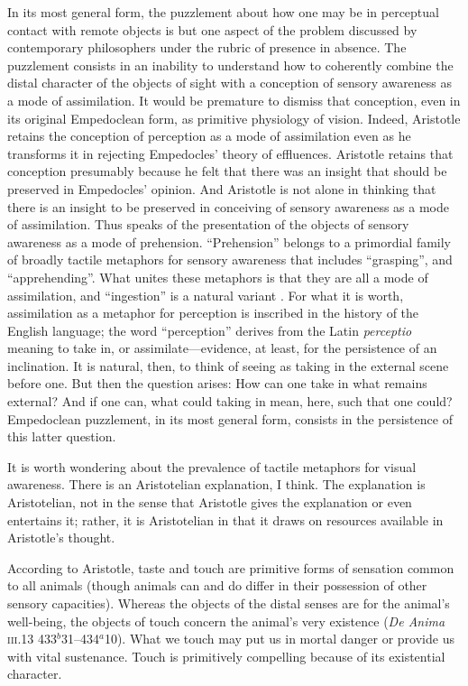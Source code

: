 In its most general form, the puzzlement about how one may be in perceptual contact with remote objects is but one aspect of the problem discussed by contemporary philosophers under the rubric of presence in absence. The puzzlement consists in an inability to understand how to coherently combine the distal character of the objects of sight with a conception of sensory awareness as a mode of assimilation. It would be premature to dismiss that conception, even in its original Empedoclean form, as primitive physiology of vision. Indeed, Aristotle retains the conception of perception as a mode of assimilation even as he transforms it in rejecting Empedocles' theory of effluences. Aristotle retains that conception presumably because he felt that there was an insight that should be preserved in Empedocles' opinion. And Aristotle is not alone in thinking that there is an insight to be preserved in conceiving of sensory awareness as a mode of assimilation. Thus \citet{Broad:1952kx} speaks of the presentation of the objects of sensory awareness as a mode of prehension.  ``Prehension'' belongs to a primordial family of broadly tactile metaphors for sensory awareness that includes ``grasping'', and ``apprehending''. What unites these metaphors is that they are all a mode of assimilation, and ``ingestion'' is a natural variant \citep[see][7]{Johnston:2006uq,Price:1932fk}. For what it is worth, assimilation as a metaphor for perception is inscribed in the history of the English language; the word ``perception'' derives from the Latin \emph{perceptio} meaning to take in, or assimilate---evidence, at least, for the persistence of an inclination. It is natural, then, to think of seeing as taking in the external scene before one. But then the question arises: How can one take in what remains external? And if one can, what could taking in mean, here, such that one could? Empedoclean puzzlement, in its most general form, consists in the persistence of this latter question.

It is worth wondering about the prevalence of tactile metaphors for visual awareness. There is an Aristotelian explanation, I think. The explanation is Aristotelian, not in the sense that Aristotle gives the explanation or even entertains it; rather, it is Aristotelian in that it draws on resources available in Aristotle's thought. 

According to Aristotle, taste and touch are primitive forms of sensation common to all animals (though animals can and do differ in their possession of other sensory capacities). Whereas the objects of the distal senses are for the animal's well-being, the objects of touch concern the animal's very existence (\emph{De Anima} \textsc{iii}.13 433\( ^{b} \)31--434\( ^{a} \)10). What we touch may put us in mortal danger or provide us with vital sustenance. Touch is primitively compelling because of its existential character.


